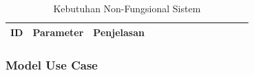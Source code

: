

\begin{table}[h]
	\caption{Kebutuhan Non-Fungsional Sistem}
	\vspace{0.25cm}
	\begin{center}
		\begin{tabular}{|c|c|p{0.7\linewidth}|}
			\hline
			\textbf{ID} & \textbf{Parameter} & \textbf{Penjelasan} \\ \hline
			
		\end{tabular}
	\end{center}
\end{table}

\subsubsection{Model Use Case}

